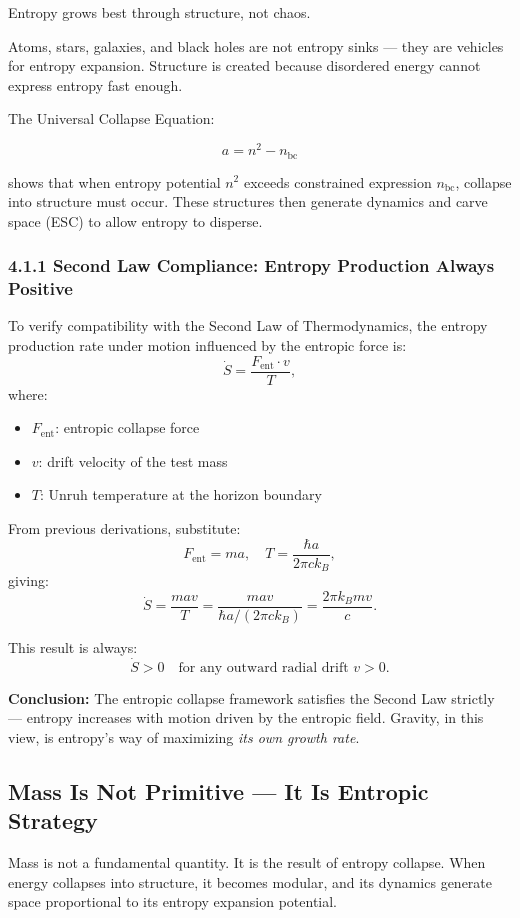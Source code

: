 \documentclass[12pt]{article}
\begin{document}
Entropy grows best through structure, not chaos.

Atoms, stars, galaxies, and black holes are not entropy sinks — they are vehicles for entropy expansion. Structure is created because disordered energy cannot express entropy fast enough.

The Universal Collapse Equation:

\[
a = n^2 - n_{\text{bc}}
\]

shows that when entropy potential $n^2$ exceeds constrained expression $n_{\text{bc}}$, collapse into structure must occur. These structures then generate dynamics and carve space (ESC) to allow entropy to disperse.

\subsubsection*{4.1.1 Second Law Compliance: Entropy Production Always Positive}

To verify compatibility with the Second Law of Thermodynamics, the entropy production rate under motion influenced by the entropic force is:
\[
\dot{S} = \frac{F_{\text{ent}} \cdot v}{T},
\]
where:
\begin{itemize}
    \item \( F_{\text{ent}} \): entropic collapse force
    \item \( v \): drift velocity of the test mass
    \item \( T \): Unruh temperature at the horizon boundary
\end{itemize}

From previous derivations, substitute:
\[
F_{\text{ent}} = m a, \quad T = \frac{\hbar a}{2\pi c k_B},
\]
giving:
\[
\dot{S} = \frac{m a v}{T} = \frac{m a v}{\hbar a/(2\pi c k_B)} = \frac{2\pi k_B m v}{c}.
\]

This result is always:
\[
\dot{S} > 0 \quad \text{for any outward radial drift } v > 0.
\]

\textbf{Conclusion:} The entropic collapse framework satisfies the Second Law strictly — entropy increases with motion driven by the entropic field. Gravity, in this view, is entropy’s way of maximizing \emph{its own growth rate}.

\subsection{Mass Is Not Primitive — It Is Entropic Strategy}

Mass is not a fundamental quantity. It is the result of entropy collapse. When energy collapses into structure, it becomes modular, and its dynamics generate space proportional to its entropy expansion potential.
\end{document}
